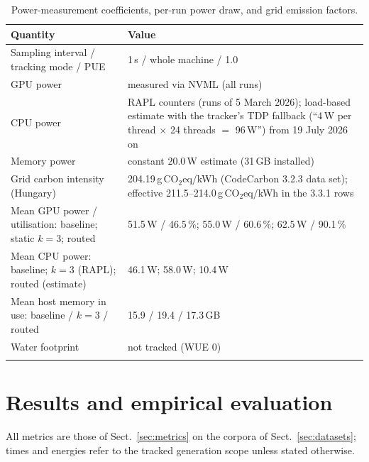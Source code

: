 \documentclass[pdflatex,sn-mathphys-num]{sn-jnl}
\newif\ifprovenance
\newcommand{\verify}[1]{\ifprovenance\textcolor{red}{{\footnotesize [VERIFY: #1]}}\fi}
\newcommand{\gco}{g\,CO$_2$eq}
\theoremstyle{thmstyleone}%
\theoremstyle{thmstylethree}%
\begin{document}
\begin{table}[htbp]
\caption{Power-measurement coefficients, per-run power draw, and grid emission factors.}\label{tab:power}
\begin{tabular}{@{}p{5.5cm}p{7.1cm}@{}}
\toprule
Quantity & Value \\
\midrule
Sampling interval / tracking mode / PUE & 1\,s / whole machine / 1.0 \\
GPU power & measured via NVML (all runs) \\
CPU power & RAPL counters (runs of 5 March 2026); load-based estimate with the tracker's TDP fallback (``4\,W per thread $\times$ 24 threads $=$ 96\,W'') from 19 July 2026 on \\
Memory power & constant 20.0\,W estimate (31\,GB installed) \\
Grid carbon intensity (Hungary) & 204.19\,\gco{}/kWh (CodeCarbon 3.2.3 data set); effective 211.5--214.0\,\gco{}/kWh in the 3.3.1 rows \\
Mean GPU power / utilisation: baseline; static $k=3$; routed & 51.5\,W / 46.5\,\%; 55.0\,W / 60.6\,\%; 62.5\,W / 90.1\,\% \\
Mean CPU power: baseline; $k=3$ (RAPL); routed (estimate) & 46.1\,W; 58.0\,W; 10.4\,W \\
Mean host memory in use: baseline / $k=3$ / routed & 15.9 / 19.4 / 17.3\,GB \\
Water footprint & not tracked (WUE 0) \\
\botrule
\end{tabular}
\ifprovenance\footnotetext{\verify{All rows are columns of \texttt{RnD/emissions\_data/emissions.csv}: \texttt{gpu\_power}, \texttt{gpu\_utilization\_percent}, \texttt{cpu\_power}, \texttt{ram\_used\_gb}, \texttt{ram\_power}, \texttt{pue}, \texttt{tracking\_mode} of the rows timestamped 2026-03-05T23:59:43 (baseline), 2026-03-05T22:53:27 (static $k=3$) and 2026-09-25T20:06:47 (routed); the TDP fallback message is in the saved CodeCarbon log of \texttt{RnD/anthropic\_traditional\_chunking.ipynb}. Rows written by CodeCarbon 3.3.1 must be read by position (two-column shift after \texttt{region}).}}\fi
\end{table}

\section{Results and empirical evaluation}\label{sec:results}

All metrics are those of Sect.~\ref{sec:metrics} on the corpora of Sect.~\ref{sec:datasets}; times and energies refer to the tracked generation scope unless stated otherwise.
\end{document}
